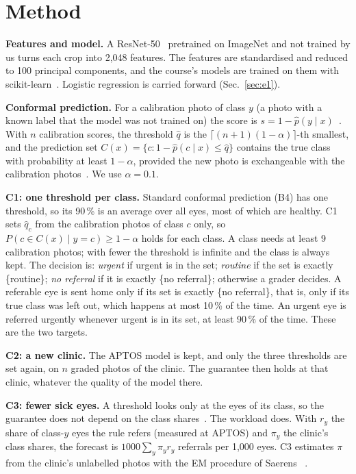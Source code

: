 \documentclass[10pt,twocolumn,letterpaper]{article}
\newcommand{\pct}{\,\%}
\begin{document}
\section{Method}\label{sec:method}
\textbf{Features and model.} A ResNet-50~\cite{he,timm} pretrained on ImageNet and not trained by us turns each crop into 2,048 features. The features are standardised and reduced to 100 principal components, and the course's models are trained on them with scikit-learn~\cite{sklearn}. Logistic regression is carried forward (Sec.~\ref{sec:e1}).

\textbf{Conformal prediction.} For a calibration photo of class $y$ (a photo with a known label that the model was not trained on) the score is $s=1-\hat p(y\mid x)$~\cite{sadinle}. With $n$ calibration scores, the threshold $\hat q$ is the $\lceil (n+1)(1-\alpha)\rceil$-th smallest, and the prediction set $C(x)=\{c: 1-\hat p(c\mid x)\le \hat q\}$ contains the true class with probability at least $1-\alpha$, provided the new photo is exchangeable with the calibration photos~\cite{vovk,angelopoulos}. We use $\alpha=0.1$.

\textbf{C1: one threshold per class.} Standard conformal prediction (B4) has one threshold, so its 90\pct{} is an average over all eyes, most of which are healthy. C1 sets $\hat q_c$ from the calibration photos of class $c$ only, so $P(c\in C(x)\mid y=c)\ge 1-\alpha$ holds for each class. A class needs at least 9 calibration photos; with fewer the threshold is infinite and the class is always kept. The decision is: \emph{urgent} if urgent is in the set; \emph{routine} if the set is exactly \{routine\}; \emph{no referral} if it is exactly \{no referral\}; otherwise a grader decides. A referable eye is sent home only if its set is exactly \{no referral\}, that is, only if its true class was left out, which happens at most 10\pct{} of the time. An urgent eye is referred urgently whenever urgent is in its set, at least 90\pct{} of the time. These are the two targets.

\textbf{C2: a new clinic.} The APTOS model is kept, and only the three thresholds are set again, on $n$ graded photos of the clinic. The guarantee then holds at that clinic, whatever the quality of the model there.

\textbf{C3: fewer sick eyes.} A threshold looks only at the eyes of its class, so the guarantee does not depend on the class shares~\cite{podkopaev}. The workload does. With $r_y$ the share of class-$y$ eyes the rule refers (measured at APTOS) and $\pi_y$ the clinic's class shares, the forecast is $1000\sum_y \pi_y r_y$ referrals per 1,000 eyes. C3 estimates $\pi$ from the clinic's unlabelled photos with the EM procedure of Saerens \etal~\cite{saerens}.
\end{document}
